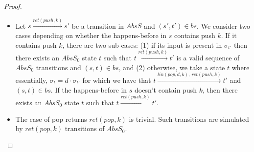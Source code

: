 \begin{proof}
\begin{itemize}
	\item Let $s\xrightarrow{ret(push,k)} s'$ be a transition in $AbsS$ and $(s',t')\in bs$. We consider two cases depending on whether the happens-before in $s$ contains push $k$. If it contains push $k$, there are two sub-cases: (1) if its input is present in $\sigma_{t'}$ then there exists an $AbsS_0$ state $t$ such that $t\xrightarrow{ret(push,k)} t'$ is a valid sequence of $AbsS_0$ transitions and $(s,t)\in bs$, and (2) otherwise, we take a state $t$ where essentially, $\sigma_t = d\cdot\sigma_{t'}$ for which we have that $t\xrightarrow{lin(pop,d,k),\ ret(push,k)} t'$ and $(s,t)\in bs$. If the happens-before in $s$ doesn't contain push $k$, then there exists an $AbsS_0$ state $t$ such that $t\xrightarrow{ret(push,k)} t'$.
	
	\item The case of pop returns $ret(pop,k)$ is trivial. Such transitions are simulated by $ret(pop,k)$ transitions of $AbsS_0$.
\end{itemize}


\end{proof}
